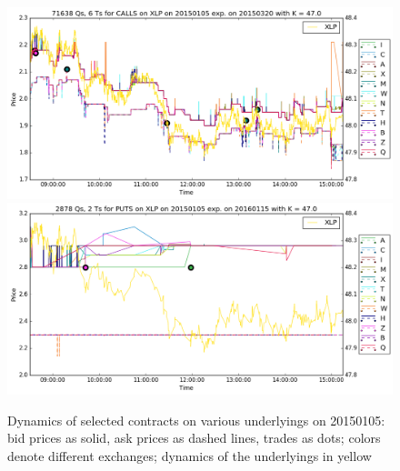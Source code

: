 \documentclass[a4paper,12pt]{article}
\theoremstyle{plain}
\theoremstyle{definition}
\begin{document}
\begin{figure}[H]
\begin{center}
 \includegraphics[width=\linewidth]{figures/contract_pics/XLP_top.png}
 \endminipage
 \hspace{3mm}
 \includegraphics[width=\linewidth]{figures/contract_pics/XLP_middle.png}
 \endminipage
\end{center}
\vspace{-3mm}
\caption{\footnotesize Dynamics of selected contracts on various underlyings on 20150105: bid prices as solid, ask prices as dashed lines, trades as dots; colors denote different exchanges; dynamics of the underlyings in yellow} 
\label{cntrt_pics_3}
\end{figure}
\vspace*{\fill}

\newpage
\end{document}
